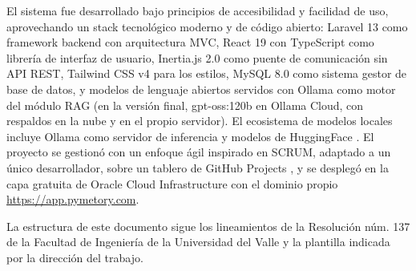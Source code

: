 El sistema fue desarrollado bajo principios de accesibilidad y facilidad de uso, aprovechando un stack tecnológico moderno y de código abierto: Laravel 13 \cite{laravel11} como framework backend con arquitectura MVC, React 19 con TypeScript como librería de interfaz de usuario, Inertia.js 2.0 \cite{inertiajs} como puente de comunicación sin API REST, Tailwind CSS v4 para los estilos, MySQL 8.0 como sistema gestor de base de datos, y modelos de lenguaje abiertos servidos con Ollama como motor del módulo RAG \cite{rag_lewis2020} (en la versión final, gpt-oss:120b en Ollama Cloud, con respaldos en la nube y en el propio servidor). El ecosistema de modelos locales incluye Ollama \cite{ollama_rest_api} como servidor de inferencia y modelos de HuggingFace \cite{huggingface}. El proyecto se gestionó con un enfoque ágil inspirado en SCRUM, adaptado a un único desarrollador, sobre un tablero de GitHub Projects \cite{github_projects}, y se desplegó en la capa gratuita de Oracle Cloud Infrastructure con el dominio propio \url{https://app.pymetory.com}.

La estructura de este documento sigue los lineamientos de la Resolución núm. 137 de la Facultad de Ingeniería de la Universidad del Valle \cite{univalle_resolucion137} y la plantilla indicada por la dirección del trabajo.
